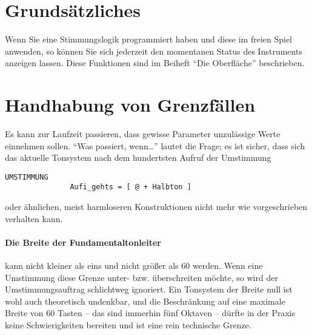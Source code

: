\section{Grundsätzliches}\label{sec:grundsatzliches}

Wenn Sie eine Stimmungslogik programmiert haben und diese im freien
Spiel anwenden, so können Sie sich jederzeit
den momentanen Status des Instruments
anzeigen lassen. Diese Funktionen sind im Beiheft "`Die Oberfläche"' beschrieben.


\section{Handhabung von Grenzfällen}\label{sec:handh-von-grenzf}
Es kann zur Laufzeit passieren, dass gewisse Parameter unzulässige
Werte einnehmen sollen. "`Was passiert, wenn\dots"'  lautet die Frage; es
ist sicher, dass sich das aktuelle Tonsystem nach dem hundertsten
Aufruf der Umstimmung
\begin{verbatim}
UMSTIMMUNG
               Aufi_gehts = [ @ + Halbton ]
\end{verbatim}
oder ähnlichen, meist harmloseren Konstruktionen nicht mehr wie
vorgeschrieben verhalten kann.

\paragraph{Die Breite der Fundamentaltonleiter} kann nicht kleiner als
eins und nicht größer als 60 werden. Wenn eine Umstimmung diese Grenze
unter- bzw. überschreiten möchte, so wird der Umstimmungsauftrag
schlichtweg ignoriert. Ein Tonsystem der Breite null ist wohl auch
theoretisch undenkbar, und die Beschränkung auf eine maximale Breite
von 60 Tasten -- das sind immerhin fünf Oktaven -- dürfte in der
Praxis keine Schwierigkeiten bereiten und ist eine rein technische
Grenze.

